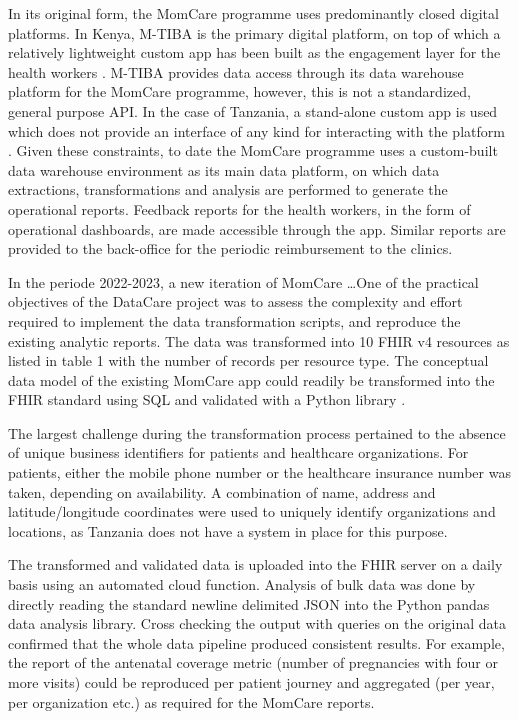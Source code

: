 \documentclass[
  authoryear]{elsarticle}
\begin{document}
In its original form, the MomCare programme uses predominantly closed
digital platforms. In Kenya, M-TIBA is the primary digital platform, on
top of which a relatively lightweight custom app has been built as the
engagement layer for the health workers \citep{huisman2022digital}.
M-TIBA provides data access through its data warehouse platform for the
MomCare programme, however, this is not a standardized, general purpose
API. In the case of Tanzania, a stand-alone custom app is used which
does not provide an interface of any kind for interacting with the
platform \citep{mrema2021application}. Given these constraints, to date
the MomCare programme uses a custom-built data warehouse environment as
its main data platform, on which data extractions, transformations and
analysis are performed to generate the operational reports. Feedback
reports for the health workers, in the form of operational dashboards,
are made accessible through the app. Similar reports are provided to the
back-office for the periodic reimbursement to the clinics.

In the periode 2022-2023, a new iteration of MomCare \ldots One of the
practical objectives of the DataCare project was to assess the
complexity and effort required to implement the data transformation
scripts, and reproduce the existing analytic reports. The data was
transformed into 10 FHIR v4 resources as listed in table 1 with the
number of records per resource type. The conceptual data model of the
existing MomCare app could readily be transformed into the FHIR standard
using SQL and validated with a Python library \citep{islam2023fhir}.

The largest challenge during the transformation process pertained to the
absence of unique business identifiers for patients and healthcare
organizations. For patients, either the mobile phone number or the
healthcare insurance number was taken, depending on availability. A
combination of name, address and latitude/longitude coordinates were
used to uniquely identify organizations and locations, as Tanzania does
not have a system in place for this purpose.

The transformed and validated data is uploaded into the FHIR server on a
daily basis using an automated cloud function. Analysis of bulk data was
done by directly reading the standard newline delimited JSON into the
Python pandas data analysis library. Cross checking the output with
queries on the original data confirmed that the whole data pipeline
produced consistent results. For example, the report of the antenatal
coverage metric (number of pregnancies with four or more visits) could
be reproduced per patient journey and aggregated (per year, per
organization etc.) as required for the MomCare reports.
\end{document}
